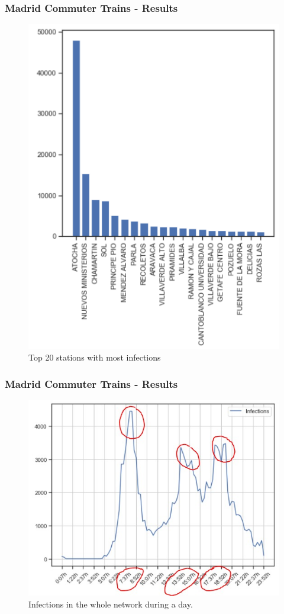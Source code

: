 \documentclass{beamer}
\begin{document}
\begin{frame}
\frametitle{Madrid Commuter Trains - Results}
\begin{figure}
	\centering
	\includegraphics[width=.4\linewidth]{Scratch_Visuals/madrid-cercanias-stats-top20.png}
	\caption{Top 20 stations with most infections}
\end{figure}
\end{frame}
\begin{frame}
\frametitle{Madrid Commuter Trains - Results}
\begin{figure}
\centering
\includegraphics[width=.6\linewidth]{Scratch_Visuals/madrid-infection-timeline.jpg}
\caption{Infections in the whole network during a day.}
\end{figure}
\end{frame}
\end{document}
